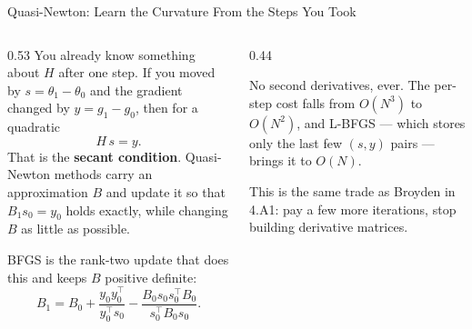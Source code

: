 \begin{frame}{Quasi-Newton: Learn the Curvature From the Steps You Took}
\begin{columns}[T]
\begin{column}{0.53\textwidth}
\small
You already know something about $H$ after one step. If you moved by $s=\theta_1-\theta_0$ and the gradient changed by $y=g_1-g_0$, then for a quadratic
\[
  H\,s=y .
\]
That is the \textbf{secant condition}. Quasi-Newton methods carry an approximation $B$ and update it so that $B_{1}s_{0}=y_{0}$ holds exactly, while changing $B$ as little as possible.
\medskip

BFGS is the rank-two update that does this and keeps $B$ positive definite:
\[
  B_{1}=B_{0}+\frac{y_0y_0^{\!\top}}{y_0^{\!\top}s_0}-\frac{B_0s_0s_0^{\!\top}B_0}{s_0^{\!\top}B_0s_0}.
\]
\end{column}
\begin{column}{0.44\textwidth}
\begin{conceptbox}[title=\textbf{What it buys}]\small
No second derivatives, ever. The per-step cost falls from $O(N^{3})$ to $O(N^{2})$, and L-BFGS --- which stores only the last few $(s,y)$ pairs --- brings it to $O(N)$.
\end{conceptbox}
\medskip
\begin{examplebox}\footnotesize
This is the same trade as Broyden in 4.A1: pay a few more iterations, stop building derivative matrices.
\end{examplebox}
\end{column}
\end{columns}
\end{frame}

